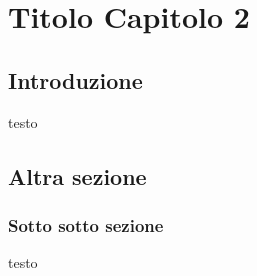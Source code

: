 \chapter{Titolo Capitolo 2}
\label{cap2}
\section{Introduzione}
\label{cap2:introduction}
testo

\clearpage

\section{Altra sezione}
\label{cap2:icnaam2013}

\subsection{Sotto sotto sezione}
\label{cap2:icnaam2013:introduction}
testo

\clearpage